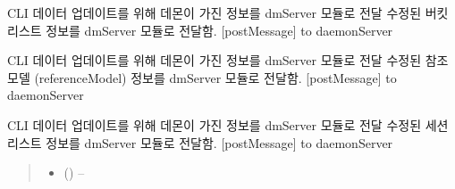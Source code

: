\documentclass[a4paper,10pt,english]{sphinxmanual}
\begin{document}
\begin{fulllineitems}
\begin{fulllineitems}
\label{\detokenize{_DHDaemon:DHDaemon._dmServerSetBucketList}}
\pysigstartsignatures
{}
\pysigstopsignatures
\sphinxAtStartPar
CLI 데이터 업데이트를 위해 데몬이 가진 정보를 dmServer 모듈로 전달
수정된 버킷 리스트 정보를 dmServer 모듈로 전달함.
{[}postMessage{]} to daemonServer

\end{fulllineitems}


\begin{fulllineitems}
\label{\detokenize{_DHDaemon:DHDaemon._dmServerSetRM}}
\pysigstartsignatures
{}
\pysigstopsignatures
\sphinxAtStartPar
CLI 데이터 업데이트를 위해 데몬이 가진 정보를 dmServer 모듈로 전달
수정된 참조 모델 (referenceModel) 정보를 dmServer 모듈로 전달함.
{[}postMessage{]} to daemonServer

\end{fulllineitems}


\begin{fulllineitems}
\label{\detokenize{_DHDaemon:DHDaemon._dmServerSetSessionList}}
\pysigstartsignatures
{}
\pysigstopsignatures
\sphinxAtStartPar
CLI 데이터 업데이트를 위해 데몬이 가진 정보를 dmServer 모듈로 전달
수정된 세션 리스트 정보를 dmServer 모듈로 전달함.
{[}postMessage{]} to daemonServer
\begin{quote}\begin{description}
\begin{itemize}
\item {} 
\sphinxAtStartPar
{} () – 


\end{itemize}
\end{description}
\end{quote}
\end{fulllineitems}
\end{fulllineitems}
\end{document}

